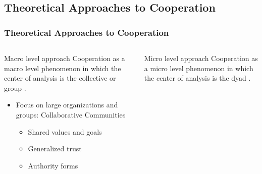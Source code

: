 \documentclass[ignorenonframetext,red,8pt,notes=show]{beamer}
\begin{document}



\subsection{Theoretical Approaches to Cooperation}
\begin{frame}[label=]
\frametitle{Theoretical Approaches to Cooperation}

\begin{columns}[c]
\begin{column}{0.5\textwidth}

\begin{block}{Macro level approach}
Cooperation as a macro level phenomenon in which the center of analysis is the collective or group \citep{marx:1990, adler:2006, adler:2015}.

\begin{itemize}

\item Focus on large organizations and groups: Collaborative Communities

\begin{itemize}

\item Shared values and goals
\item Generalized trust
\item Authority forms

\end{itemize}
\end{itemize}
\end{block}
\end{column}

\pause

\begin{column}{0.5\textwidth}

\begin{block}{Micro level approach}
Cooperation as a micro level phenomenon in which the center of analysis is the dyad \citep{axelrod1981, watts:1999, eguiluz:2005}.

\begin{itemize}


\end{itemize}
\end{block}
\end{column}
\end{columns}
\end{frame}
\end{document}
